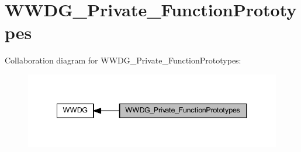 \hypertarget{group___w_w_d_g___private___function_prototypes}{}\section{W\+W\+D\+G\+\_\+\+Private\+\_\+\+Function\+Prototypes}
\label{group___w_w_d_g___private___function_prototypes}
Collaboration diagram for W\+W\+D\+G\+\_\+\+Private\+\_\+\+Function\+Prototypes\+:
\nopagebreak
\begin{figure}[H]
\begin{center}
\leavevmode
\includegraphics[width=341pt]{group___w_w_d_g___private___function_prototypes}
\end{center}
\end{figure}

